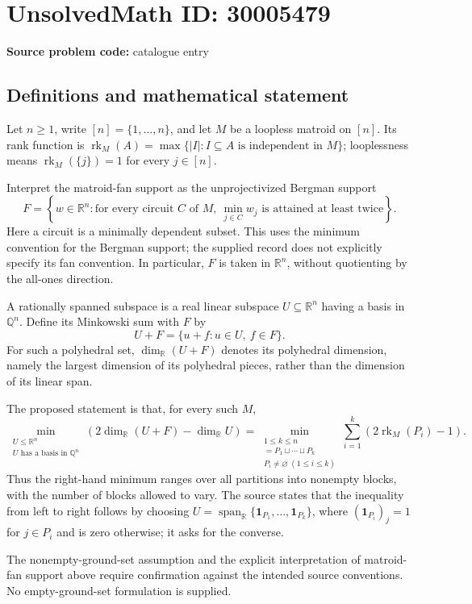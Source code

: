 \documentclass[11pt]{article}
\newcommand{\Q}{\mathbb{Q}}
\newcommand{\R}{\mathbb{R}}
\begin{document}
\section*{UnsolvedMath ID: 30005479}
\textbf{Source problem code:} catalogue entry
\subsection{Definitions and mathematical statement}
Let \(n\geq 1\), write \([n]=\{1,\ldots,n\}\), and let \(M\) be a loopless matroid on \([n]\). Its rank function is \(\operatorname{rk}_M(A)=\max\{|I|:I\subseteq A\text{ is independent in }M\}\); looplessness means \(\operatorname{rk}_M(\{j\})=1\) for every \(j\in[n]\).

Interpret the matroid-fan support as the unprojectivized Bergman support
\[
F=\left\{w\in\R^n:\text{for every circuit }C\text{ of }M,\ \min_{j\in C}w_j\text{ is attained at least twice}\right\}.
\]
Here a circuit is a minimally dependent subset. This uses the minimum convention for the Bergman support; the supplied record does not explicitly specify its fan convention. In particular, \(F\) is taken in \(\R^n\), without quotienting by the all-ones direction.

A rationally spanned subspace is a real linear subspace \(U\subseteq\R^n\) having a basis in \(\Q^n\). Define its Minkowski sum with \(F\) by
\[
U+F=\{u+f:u\in U,\ f\in F\}.
\]
For such a polyhedral set, \(\dim_{\R}(U+F)\) denotes its polyhedral dimension, namely the largest dimension of its polyhedral pieces, rather than the dimension of its linear span.

The proposed statement is that, for every such \(M\),
\[
\min_{\substack{U\leq\R^n\\U\text{ has a basis in }\Q^n}}
\left(2\dim_{\R}(U+F)-\dim_{\R}U\right)
=
\min_{\substack{1\leq k\leq n\\[n]=P_1\sqcup\cdots\sqcup P_k\\P_i\neq\varnothing\ (1\leq i\leq k)}}
\sum_{i=1}^{k}\left(2\operatorname{rk}_M(P_i)-1\right).
\]
Thus the right-hand minimum ranges over all partitions into nonempty blocks, with the number of blocks allowed to vary. The source states that the inequality from left to right follows by choosing \(U=\operatorname{span}_{\R}\{\mathbf{1}_{P_1},\ldots,\mathbf{1}_{P_k}\}\), where \((\mathbf{1}_{P_i})_j=1\) for \(j\in P_i\) and is zero otherwise; it asks for the converse.

The nonempty-ground-set assumption and the explicit interpretation of matroid-fan support above require confirmation against the intended source conventions. No empty-ground-set formulation is supplied.
\end{document}
